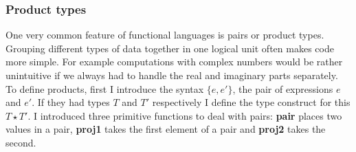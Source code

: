\documentclass[12pt,twoside,notitlepage]{report}
\begin{document}
\subsubsection{Product types}
One very common feature of functional languages is pairs or product types. Grouping different types of data together in one logical unit often makes code more simple. For example computations with complex numbers would be rather unintuitive if we always had to handle the real and imaginary parts separately. To define products, first I introduce the syntax $ \{e, e' \} $, the pair of expressions $ e $ and $ e' $. If they had types $ T $ and $ T' $ respectively I define the type construct for this $ T\star T' $. I introduced three primitive functions to deal with pairs: \textbf{pair} places two values in a pair, \textbf{proj1} takes the first element of a pair and \textbf{proj2} takes the second.
\end{document}
